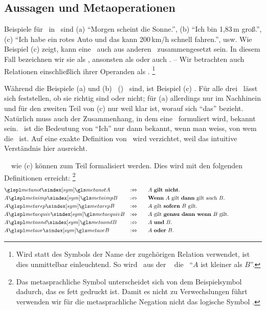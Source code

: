 \subsection{Aussagen und Metaoperationen}%
\label{sub:AussagenUndMetaoperationen}

Beispiele für \ in \Metasprache\ sind
(a) \enquote{Morgen scheint die Sonne.},
(b) \enquote{Ich bin 1,83\,m groß.},
(c) \enquote{Ich habe ein rotes Auto und das kann 200\,km/h schnell fahren.}, usw.
Wie Beispiel (c) zeigt, kann eine \Aussage\ auch aus anderen \Aussagen\ zusammengesetzt sein.
In diesem Fall bezeichnen wir sie als , ansonsten als  oder auch .
-- Wir betrachten auch Relationen einschließlich ihrer Operanden als \Aussagen.%
\footnote{%
	Wird statt des Symbols der Name der zugehörigen Relation verwendet, ist dies unmittelbar einleuchtend.
	So wird \textzB\ aus der \Formel\  die \Aussage\ \enquote{$A$ ist kleiner als $B$}.
}

Während die Beispiele (a) und (b) \unzerlegbare\ () \Aussagen\ sind, ist Beispiel (c) \zerlegbar.
Für alle drei \Aussagen\ lässt sich feststellen, ob sie richtig sind oder nicht;
für (a) allerdings nur im Nachhinein und für den zweiten Teil von (c) nur weil klar ist, worauf sich \enquote{das} bezieht.
Natürlich muss auch der Zusammenhang, in dem eine \Aussage\ formuliert wird, bekannt sein.
\textZB\ ist die Bedeutung von \enquote{Ich} nur dann bekannt, wenn man weiss, von wem die \Aussage\ ist.
Auf eine exakte Definition von \Aussage\ wird verzichtet, weil das intuitive Verständnis hier ausreicht.

\Zerlegbare\ \Aussagen\ wie (c) können zum Teil formalisiert werden.
Dies wird mit den folgenden Definitionen erreicht:%
\footnote{%
	Das metasprachliche Symbol  unterscheidet sich von dem Beispielsymbol  dadurch, das es fett gedruckt ist.
	Damit es nicht zu Verwechslungen führt verwenden wir für die metasprachliche Negation nicht das logische Symbol .
}
\begin{align}
	&   \glsSym{metanot}   A & \metadefeq & \qquad
	\text{$A$ \defn{gilt nicht}.}
	\\
	& A \glsSym{metaimp}   B & \metadefeq & \qquad
	\text{\defn{Wenn} $A$ gilt \defn{dann} gilt auch $B$.}
	\\
	& A \glsSym{metarep}   B & \metadefeq & \qquad
	\text{$A$ gilt \defn{sofern} $B$ gilt.}
	\\
	& A \glsSym{metaequiv} B & \metadefeq & \qquad
	\text{$A$ gilt \defn{genau dann wenn} $B$ gilt.}
	\\
	& A \glsSym{metaand}   B & \metadefeq & \qquad
	\text{$A$ \defn{und}  $B$.}
	\\
	& A \glsSym{metaor}    B & \metadefeq & \qquad
	\text{$A$ \defn{oder} $B$.}
	\formulatoleft
\end{align}

